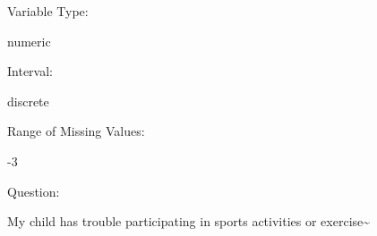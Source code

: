 \documentclass[
]{article}
\begin{document}
\begin{minipage}[t]{0.3\linewidth}

Variable Type:

\end{minipage}%
\begin{minipage}[t]{0.7\linewidth}

numeric

\end{minipage}

\begin{minipage}[t]{0.3\linewidth}

Interval:

\end{minipage}%
\begin{minipage}[t]{0.7\linewidth}

discrete

\end{minipage}

\begin{minipage}[t]{0.3\linewidth}

Range of Missing Values:

\end{minipage}%
\begin{minipage}[t]{0.7\linewidth}

-3

\end{minipage}

\begin{minipage}[t]{0.3\linewidth}

Question:

\end{minipage}%
\begin{minipage}[t]{0.7\linewidth}

My child has trouble participating in sports activities or
exercise\textasciitilde{}

\end{minipage}
\end{document}

